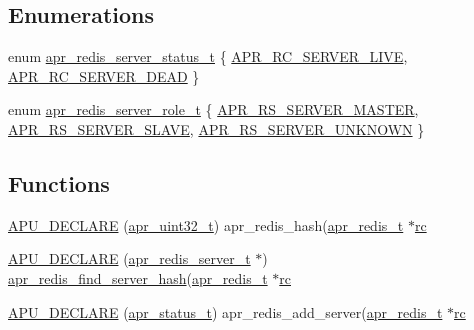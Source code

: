 \subsection*{Enumerations}
\begin{DoxyCompactItemize}
\item 
enum \hyperlink{group__APR__Util__RC_gaab66b126b216452bfae7e27f1ecdff8d}{apr\+\_\+redis\+\_\+server\+\_\+status\+\_\+t} \{ \hyperlink{group__APR__Util__RC_ggaab66b126b216452bfae7e27f1ecdff8da23ba9dc7877e94fe88cdf9adbb9a8244}{A\+P\+R\+\_\+\+R\+C\+\_\+\+S\+E\+R\+V\+E\+R\+\_\+\+L\+I\+VE}, 
\hyperlink{group__APR__Util__RC_ggaab66b126b216452bfae7e27f1ecdff8da7007f5d2a45e362168d8f317321c4b3a}{A\+P\+R\+\_\+\+R\+C\+\_\+\+S\+E\+R\+V\+E\+R\+\_\+\+D\+E\+AD}
 \}
\item 
enum \hyperlink{group__APR__Util__RC_ga2ea331e208371373bf937ec1a77bb867}{apr\+\_\+redis\+\_\+server\+\_\+role\+\_\+t} \{ \hyperlink{group__APR__Util__RC_gga2ea331e208371373bf937ec1a77bb867a71bddecba04705afdb8e42841df3b0b1}{A\+P\+R\+\_\+\+R\+S\+\_\+\+S\+E\+R\+V\+E\+R\+\_\+\+M\+A\+S\+T\+ER}, 
\hyperlink{group__APR__Util__RC_gga2ea331e208371373bf937ec1a77bb867aed519c7ada7da7e3621a89a9f4178e9c}{A\+P\+R\+\_\+\+R\+S\+\_\+\+S\+E\+R\+V\+E\+R\+\_\+\+S\+L\+A\+VE}, 
\hyperlink{group__APR__Util__RC_gga2ea331e208371373bf937ec1a77bb867ac2c0f3bd886578f1cff2d2faa4e06cc6}{A\+P\+R\+\_\+\+R\+S\+\_\+\+S\+E\+R\+V\+E\+R\+\_\+\+U\+N\+K\+N\+O\+WN}
 \}
\end{DoxyCompactItemize}
\subsection*{Functions}
\begin{DoxyCompactItemize}
\item 
\hyperlink{group__APR__Util__RC_ga0320ff12fe08e295265a06e0b615bde3}{A\+P\+U\+\_\+\+D\+E\+C\+L\+A\+RE} (\hyperlink{group__apr__platform_ga558548a135d8a816c4787250744ea147}{apr\+\_\+uint32\+\_\+t}) apr\+\_\+redis\+\_\+hash(\hyperlink{structapr__redis__t}{apr\+\_\+redis\+\_\+t} $\ast$\hyperlink{group__APR__Util__RC_ga38828c1c35a96d3d86edce1458ba991f}{rc}
\item 
\hyperlink{group__APR__Util__RC_ga4032db1164e06580e79858f2effd5a90}{A\+P\+U\+\_\+\+D\+E\+C\+L\+A\+RE} (\hyperlink{structapr__redis__server__t}{apr\+\_\+redis\+\_\+server\+\_\+t} $\ast$) \hyperlink{apr__redis_8c_a31a1bf0748f91cb73d35c3c8b3385be1}{apr\+\_\+redis\+\_\+find\+\_\+server\+\_\+hash}(\hyperlink{structapr__redis__t}{apr\+\_\+redis\+\_\+t} $\ast$\hyperlink{group__APR__Util__RC_ga38828c1c35a96d3d86edce1458ba991f}{rc}
\item 
\hyperlink{group__APR__Util__RC_ga316226b43bc33d042d27e089f84d6f60}{A\+P\+U\+\_\+\+D\+E\+C\+L\+A\+RE} (\hyperlink{group__apr__errno_gaa5105fa83cc322f09382292db8b47593}{apr\+\_\+status\+\_\+t}) apr\+\_\+redis\+\_\+add\+\_\+server(\hyperlink{structapr__redis__t}{apr\+\_\+redis\+\_\+t} $\ast$\hyperlink{group__APR__Util__RC_ga38828c1c35a96d3d86edce1458ba991f}{rc}
\end{DoxyCompactItemize}
